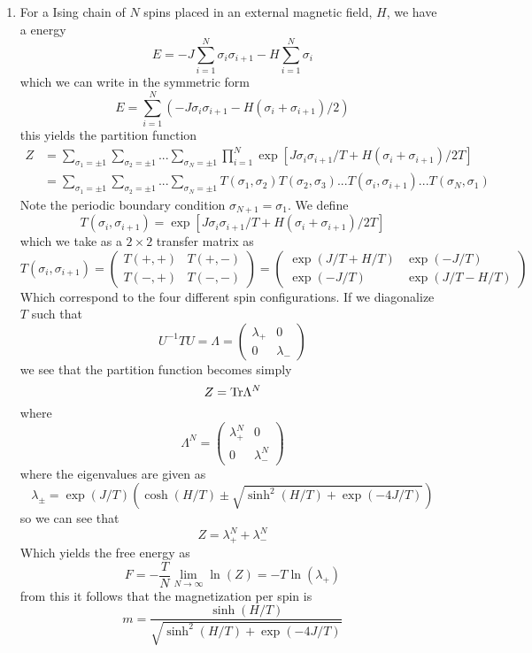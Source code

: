 \documentclass[11pt]{article}
\numberwithin{equation}{section}
\begin{document}
\begin{enumerate}[(1)]
\item For a Ising chain of $N$ spins placed in an external magnetic field, $H$, we have a 
energy
$$E = -J\sum_{i=1}^{N}\sigma_i\sigma_{i+1}-H\sum_{i=1}^{N}\sigma_{i}$$
which we can write in the symmetric form
$$E = \sum_{i=1}^{N}\left(-J\sigma_i\sigma_{i+1}-H(\sigma_{i}+\sigma_{i+1})/2\right)$$
this yields the partition function
\begin{align*}
Z &= \sum_{\sigma_1=\pm1}\sum_{\sigma_2=\pm1}...\sum_{\sigma_N=\pm1}\prod_{i=1}^{N}\exp[J\sigma_{i}\sigma_{i+1}/T+H(\sigma_i+\sigma_{i+1})/2T]\\
&= \sum_{\sigma_1=\pm1}\sum_{\sigma_2=\pm1}...\sum_{\sigma_N=\pm1}T(\sigma_1,\sigma_2)T(\sigma_2,\sigma_3)...T(\sigma_i,\sigma_{i+1})...T(\sigma_N,\sigma_1)
\end{align*}
Note the periodic boundary condition $\sigma_{N+1} = \sigma_1$. We define
$$T(\sigma_{i},\sigma_{i+1}) = \exp[J\sigma_{i}\sigma_{i+1}/T+H(\sigma_i+\sigma_{i+1})/2T]$$
which we take as a $2\times2$ transfer matrix as
$$T(\sigma_{i},\sigma_{i+1}) = \left(\begin{array}{cc}
                                T(+,+) &T(+,-)\\
                                T(-,+) &T(-,-)
                               \end{array}\right)
= \left(\begin{array}{cc}
       \exp(J/T+H/T)  &\exp(-J/T)\\
       \exp(-J/T)     &\exp(J/T-H/T)
  \end{array}\right)$$
Which correspond to the four different spin configurations. If we diagonalize $T$ such that
$$U^{-1}TU = \Lambda = \left(\begin{array}{cc}
                         \lambda_{+}   &0\\
                         0             &\lambda_{-}
                       \end{array}\right)$$
we see that the partition function becomes simply
$$Z = \textnormal{Tr}\Lambda^N$$
where
$$\Lambda^N = \left(\begin{array}{cc}
                         \lambda_{+}^N   &0\\
                         0               &\lambda_{-}^N    
                       \end{array}\right)$$
where the eigenvalues are given as
$$\lambda_{\pm} = \exp(J/T)\left(\cosh(H/T)\pm\sqrt{\sinh^2(H/T)+\exp(-4J/T)}\right)$$
so we can see that 
$$Z = \lambda_{+}^N + \lambda_{-}^N$$
Which yields the free energy as
$$F = -\frac{T}{N}\lim_{N\rightarrow\infty}\ln(Z) = -T\ln(\lambda_{+})$$
from this it follows that the magnetization per spin is
$$m = \frac{\sinh(H/T)}{\sqrt{\sinh^2(H/T)+\exp(-4J/T)}}$$
\end{enumerate}
\end{document}
